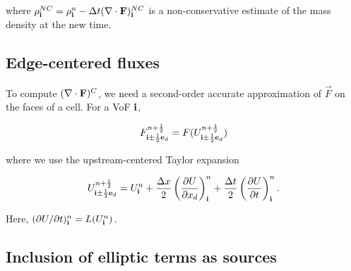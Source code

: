 \noindent 
where $\rho^{NC}_{\bf i} = \rho^n_{\bf i} - \Delta t(\nabla\cdot{\mathbf{F}})^{NC}_{\bf i}$ is a 
non-conservative estimate of the mass density at the new time.

\subsection{Edge-centered fluxes}

To compute $(\nabla\cdot{\mathbf{F}})^C$, we need a second-order accurate approximation 
of $\vec{F}$ on the faces of a cell. For a VoF ${\bf i}$,

\begin{equation}
F^{n+\frac{1}{2}}_{{\bf i}\pm\frac{1}{2}{\bf e}_d} = F(U^{n+\frac{1}{2}}_{{\bf i}\pm\frac{1}{2}{\bf e}_d}) \label{eq:edgeCenteredFluxes}
\end{equation}

\noindent
where we use the upstream-centered Taylor expansion

\begin{equation}
U^{n+\frac{1}{2}}_{{\bf i}\pm\frac{1}{2}{\bf e}_d} = U^n_{\bf i} + \frac{\Delta x}{2}\left(\frac{\partial U}{\partial x_d}\right)^n_{\bf i} + 
                                 \frac{\Delta t}{2}\left(\frac{\partial U}{\partial t}\right)^n_{\bf i}. \label{eq:edgeCenteredU}
\end{equation}

\noindent
Here, $(\partial U/\partial t)^n_{\bf i} = L(U^n_{\bf i})$.

\subsection{Inclusion of elliptic terms as sources}

